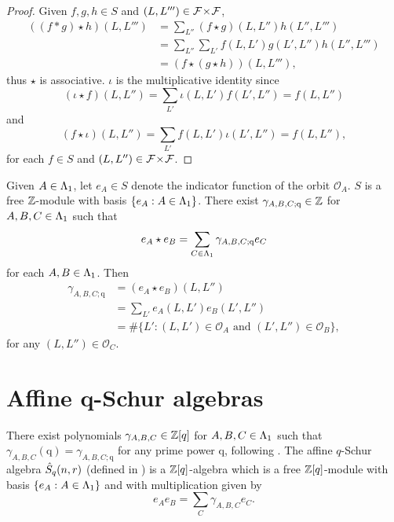 \documentclass[a4paper, 11pt]{report}
\begin{document}
\begin{proof}
Given $f,g,h\in S$ and $(L,L''')\in{\mathcal{F}\!\times\!\mathcal{F}}$,
\begin{align*}
((f\ast g)\star h)(L,L''')
&= \sum_{L''} (f\star g)(L,L'')h(L'',L''')\\
&= \sum_{L''}\sum_{L'} f(L,L')g(L',L'')h(L'',L''')\\
&= (f\star (g\star h))(L,L'''),
\end{align*}
thus $\star$ is associative. $\iota$ is the multiplicative identity since
\begin{equation*}
(\iota\star f)(L,L'') = \sum_{L'}\iota(L,L')f(L',L'') = f(L,L'')
\end{equation*}
and
\begin{equation*}
(f\star\iota)(L,L'') = \sum_{L'}f(L,L')\iota(L',L'') = f(L,L''),
\end{equation*}
for each $f\in S$ and $(L,L'')\in{\mathcal{F}\!\times\!\mathcal{F}}$.
\end{proof}

Given $A\in{\Lambda_1}$, let $e_A\in S$ denote the indicator function of the orbit $\mathcal{O}_A$. $S$ is a free $\mathbb{Z}$-module with basis $\{e_A:A\in{\Lambda_1}\}$. There exist $\gamma_{A,B,C;\mathrm{q}}\in\mathbb{Z}$ for $A,B,C\in{\Lambda_1}$ such that
\begin{equation*}
e_A\star e_B = \sum_{C\in{\Lambda_1}} \gamma_{A,B,C;\mathrm{q}}e_C
\end{equation*}
for each $A,B\in{\Lambda_1}$. Then
\begin{align*}
\gamma_{A,B,C;\mathrm{q}}
&=(e_A\star e_B)(L,L'')\\
&= \sum_{L'} e_A(L,L')e_B(L',L'')\\
&= \#\{L':(L,L')\in\mathcal{O}_A \text{ and }(L',L'')\in\mathcal{O}_B\},
\end{align*}
for any $(L,L'')\in\mathcal{O}_C$.

\section{Affine q-Schur algebras}

There exist polynomials $\gamma_{A,B,C}\in\mathbb{Z}[q]$ for $A,B,C\in{\Lambda_1}$ such that $\gamma_{A,B,C}(\mathrm{q}) = \gamma_{A,B,C;\mathrm{q}}$ for any prime power $\mathrm{q}$, following \cite[section 4]{lusztig99}. The affine $q$-Schur algebra $\hat{S}_q(n,r)$ (defined in \needsreference) is a $\mathbb{Z}[q]$-algebra which is a free $\mathbb{Z}[q]$-module with basis $\{e_A:A\in{\Lambda_1}\}$ and with multiplication given by
\begin{equation*}
e_A e_B = \sum_{C} \gamma_{A,B,C}e_C.
\end{equation*}
\end{document}
